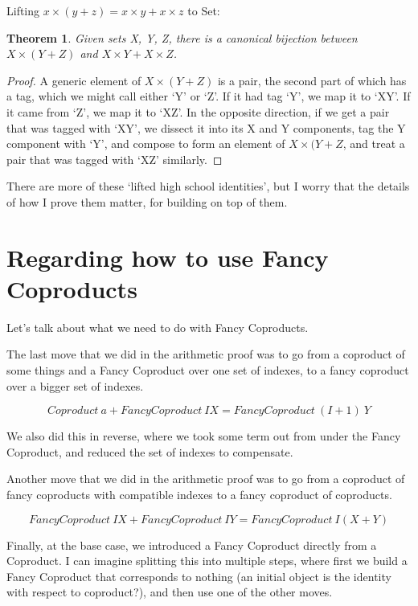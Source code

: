 \documentclass{proc-l}
\newtheorem{theorem}{Theorem}[section]
\theoremstyle{definition}
\theoremstyle{remark}
\numberwithin{equation}{section}
\begin{document}
Lifting \(x \times (y + z) = x \times y + x \times z\) to Set:

\begin{theorem}
Given sets X, Y, Z, there is a canonical bijection between \(X \times (Y + Z)\) and \(X \times Y + X \times Z\).
\end{theorem}

\begin{proof}
A generic element of \(X \times (Y + Z)\) is a pair, the second part of which has a tag, which we might call either `Y' or `Z'. If it had tag `Y', we map it to `XY'. If it came from `Z', we map it to `XZ'. In the opposite direction, if we get a pair that was tagged with `XY', we dissect it into its X and Y components, tag the Y component with `Y', and compose to form an element of \(X \times (Y + Z\), and treat a pair that was tagged with `XZ' similarly. 
\end{proof}

There are more of these `lifted high school identities', but I worry that the details of how I prove them matter, for building on top of them.

\section{Regarding how to use Fancy Coproducts}

Let's talk about what we need to do with Fancy Coproducts.

The last move that we did in the arithmetic proof was
to go from a coproduct of some things and a Fancy Coproduct over one set of indexes, to a fancy coproduct over a bigger set of indexes.

\[
Coproduct~a + FancyCoproduct~I X = FancyCoproduct~(I+1)~Y
\]

We also did this in reverse, where we took some term out from under the Fancy Coproduct, and reduced the set of indexes to compensate.

Another move that we did in the arithmetic proof was
to go from a coproduct of fancy coproducts with compatible indexes to a fancy coproduct of coproducts.

\[
FancyCoproduct~I X + FancyCoproduct~I Y = FancyCoproduct~I (X + Y)
\]


Finally, at the base case, we introduced a Fancy Coproduct directly from a Coproduct. I can imagine splitting this into multiple steps,
where first we build a Fancy Coproduct that corresponds to nothing (an initial object is the identity with respect to coproduct?), and then use one of the other moves.
\end{document}
